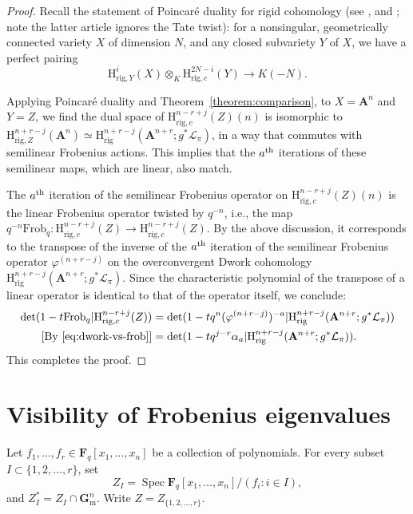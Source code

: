\documentclass{amsart}
\numberwithin{equation}{section}
\theoremstyle{plain}
\theoremstyle{definition}
\renewcommand{\mathbb}{\mathbf}
\begin{document}
\begin{proof}
Recall the statement of Poincaré duality for rigid cohomology (see
\cite[Corollary~8.3.14]{le-stum:rigid-cohomology}, and
\cite[Theorem~1.2.3]{kedlaya:finiteness-rigid-cohomology}; note the
latter article ignores the Tate twist): for a nonsingular,
geometrically connected variety \(X\) of dimension \(N\), and any
closed subvariety \(Y\) of \(X\), we have a perfect pairing
\begin{equation*}
\mathrm{H}^{i}_{\mathrm{rig},Y}(X) \otimes_K \mathrm{H}^{2N-i}_{\mathrm{rig},c}(Y) \to K(-N).
\end{equation*}

Applying Poincaré duality and Theorem~\ref{theorem:comparison}, to
\(X = \mathbb{A}^{n}\) and \(Y=Z\), we find the dual space of
\(\mathrm{H}^{n-r+j}_{\mathrm{rig},c}(Z)(n)\) is isomorphic to
\(\mathrm{H}^{n+r-j}_{\mathrm{rig},Z}(\mathbb{A}^{n})\simeq\mathrm{H}^{n+r-j}_{\mathrm{rig}}(\mathbb{A}^{n+r};g^{\ast}\mathcal{L}_{\pi})\),
in a way that commutes with semilinear Frobenius actions.  This
implies that the \(a\textsuperscript{th}\) iterations of these
semilinear maps, which are linear, also match.

The \(a\textsuperscript{th}\) iteration of the semilinear Frobenius
operator on \(\mathrm{H}^{n-r+j}_{\mathrm{rig},c}(Z)(n)\) is the
linear Frobenius operator twisted by \(q^{-n}\), i.e., the map
\(q^{-n}\mathrm{Frob}_{q}\colon\mathrm{H}^{n-r+j}_{\mathrm{rig},c}(Z)\to\mathrm{H}^{n-r+j}_{\mathrm{rig},c}(Z)\).
By the above discussion, it corresponds to the transpose of the
inverse of the \(a\textsuperscript{th}\) iteration of the semilinear
Frobenius operator \(\varphi^{(n+r-j)}\) on the overconvergent Dwork
cohomology
\(\mathrm{H}^{n+r-j}_{\mathrm{rig}}(\mathbb{A}^{n+r};g^{\ast}\mathcal{L}_{\pi})\).
Since the characteristic polynomial of the transpose of a linear
operator is identical to that of the operator itself, we conclude:
\begin{align*}
  \det(1-t\mathrm{Frob}_{q}| \mathrm{H}^{n-r+j}_{\mathrm{rig},c}(Z))
  &= \det(1 - tq^{n}(\varphi^{(n+r-j)})^{-a}| \mathrm{H}^{n+r-j}_{\mathrm{rig}}(\mathbb{A}^{n+r};g^{\ast}\mathcal{L}_{\pi})) \\
  \text{[By \eqref{eq:dwork-vs-frob}]} &= \det(1 - tq^{j-r}\alpha_{a}|\mathrm{H}^{n+r-j}_{\mathrm{rig}}(\mathbb{A}^{n+r};g^{\ast}\mathcal{L}_{\pi})).
\end{align*}
This completes the proof.
\end{proof}

\section{Visibility of Frobenius eigenvalues}
\label{sec:visibility}
Let \(f_{1},\ldots,f_{r} \in \mathbb{F}_{q}[x_1,\ldots,x_n]\) be a
collection of polynomials.  For every subset
\(I \subset \{1,2,\ldots,r\}\), set
\[
Z_{I}= \operatorname{Spec}\mathbb{F}_q[x_1,\ldots,x_n]/(f_i : i\in I),
\]
and \(Z_{I}^{\ast} = Z_{I} \cap \mathbb{G}_{\mathrm{m}}^{n}\).
Write \(Z=Z_{\{1,2,\ldots,r\}}\).
\end{document}
